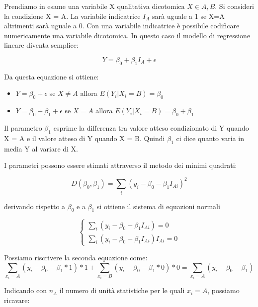 \documentclass[a4paper]{extarticle}
\begin{document}
Prendiamo in esame una variabile X qualitativa dicotomica $X \in {A,B}$. Si consideri la condizione X = A. La variabile indicatrice $I_A$ sarà uguale a 1 se X=A altrimenti sarà uguale a 0. Con una variabile indicatrice è possibile codificare numericamente una variabile dicotomica. In questo caso il modello di regressione lineare diventa semplice:

\begin{equation*}
Y = \beta_0 + \beta_1 I_A +\epsilon
\end{equation*}

Da questa equazione si ottiene:

\begin{itemize}
\item $ Y = \beta_0 + \epsilon$ se $X \not = A$ allora $E(Y_i|X_i = B) = \beta_0$
\item $ Y = \beta_0 + \beta_1 + \epsilon$ se $X  = A$ allora $E(Y_i|X_i = B) = \beta_0 + \beta_1$
\end{itemize}

Il parametro $\beta_1$ esprime la differenza tra valore atteso condizionato di Y quando X = A e il valore atteso di Y quando X = B. Quindi $\beta_1$ ci dice quanto varia in media Y al variare di X.

I parametri possono essere stimati attraverso il metodo dei minimi quadrati:

\begin{equation*}
D(\beta_0,\beta_1) = \sum\limits_i(y_i - \beta_0 - \beta_1 I_{Ai})^2
\end{equation*}

derivando rispetto a $\beta_0$ e a $\beta_1$ si ottiene il sistema di equazioni normali

\begin{equation*}
\begin{cases}
		\sum\limits_i(y_i-\beta_0 - \beta_1I_{Ai}) = 0\\
		\sum\limits_i(y_i-\beta_0 - \beta_1I_{Ai})I_{Ai} = 0
	\end{cases}
\end{equation*}

Possiamo riscrivere la seconda equazione come:
\begin{equation*}
\sum\limits_{x_i=A} (y_i - \beta_0 - \beta_1 *1)*1 + \sum\limits_{x_i=B} (y_i - \beta_0 - \beta_1 *0)*0 = \sum\limits_{x_i=A} (y_i - \beta_0 - \beta_1 )
\end{equation*}

Indicando con $n_A$ il numero di unità statistiche per le quali $x_i = A$, possiamo ricavare:
\end{document}
